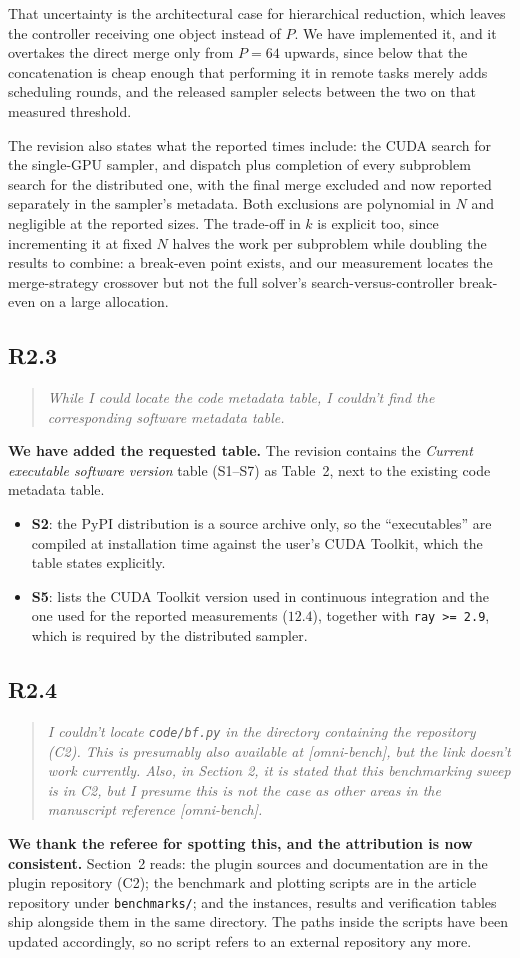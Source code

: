 \documentclass[11pt,a4paper]{article}
\newenvironment{reviewercomment}
  {\begin{quote}\itshape\small}
  {\end{quote}}
\newcommand{\point}[2]{%
  \subsection*{#1}%
  \begin{reviewercomment}#2\end{reviewercomment}}
\begin{document}
That uncertainty is the architectural case for hierarchical reduction, which leaves the
controller receiving one object instead of $P$. We have implemented it, and it overtakes the direct
merge only from $P=64$ upwards, since below that the concatenation is cheap enough that
performing it in remote tasks merely adds scheduling rounds, and the released sampler selects
between the two on that measured threshold.

The revision also states what the reported times include: the CUDA search for the single-GPU
sampler, and dispatch plus completion of every subproblem search for the distributed one, with
the final merge excluded and now reported separately in the sampler's metadata. Both exclusions
are polynomial in $N$ and negligible at the reported sizes. The trade-off in $k$ is explicit
too, since incrementing it at fixed $N$ halves the work per subproblem while doubling the
results to combine: a break-even point exists, and our measurement locates the merge-strategy
crossover but not the full solver's search-versus-controller break-even on a large allocation.

\point{R2.3}{While I could locate the code metadata table, I couldn't find the corresponding
software metadata table.}

\textbf{We have added the requested table.} The revision contains the \emph{Current executable software version} table
(S1--S7) as Table~2, next to the existing code metadata table.

\begin{itemize}[leftmargin=*]
\item \textbf{S2}: the PyPI distribution is a source archive only, so the ``executables'' are
compiled at installation time against the user's CUDA Toolkit, which the table states
explicitly.
\item \textbf{S5}: lists the CUDA Toolkit version used in continuous integration and the one
used for the reported measurements ($12.4$), together with \texttt{ray >= 2.9}, which is
required by the distributed sampler.
\end{itemize}

\point{R2.4}{I couldn't locate \texttt{code/bf.py} in the directory containing the repository
(C2). This is presumably also available at [omni-bench], but the link doesn't work currently.
Also, in Section 2, it is stated that this benchmarking sweep is in C2, but I presume this is
not the case as other areas in the manuscript reference [omni-bench].}

\textbf{We thank the referee for spotting this, and the attribution is now consistent.}
Section~2 reads: the plugin sources and documentation are in the plugin repository (C2); the
benchmark and plotting scripts are in the article repository under \texttt{benchmarks/}; and
the instances, results and verification tables ship alongside them in the same directory. The
paths inside the scripts have been updated accordingly, so no script refers to an external
repository any more.
\end{document}
